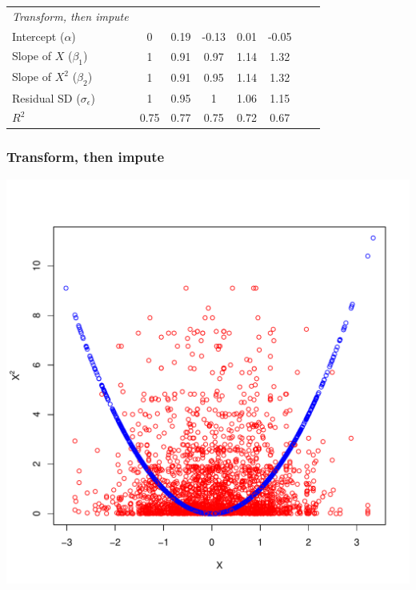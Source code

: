 \documentclass{beamer}
\begin{document}
\begin{frame}
{\begin{tabular}{lcccccrl}
\textit{Transform, then impute}	&&&&&\\
Intercept ($\alpha$)				&0		&0.19	&-0.13	&0.01	&-0.05\\
Slope of $X$ ($\beta_1$)			&1		&0.91	&0.97	&1.14	&1.32\\
Slope of $X^2$ ($\beta_2$)		&1		&0.91	&0.95	&1.14	&1.32\\
Residual SD ($\sigma_\epsilon$) 	&1		&0.95	&1		&1.06	&1.15\\
$R^2$						&0.75	&0.77	&0.75	&0.72	&0.67\\\hline
\end{tabular}
}

 \end{frame}
 
\begin{frame}
  \frametitle{Transform, then impute}
  \vspace{-.45 in} %
  \centering
\includegraphics[scale=.55]{sepvar.pdf}
 \end{frame}
 
\end{document}

